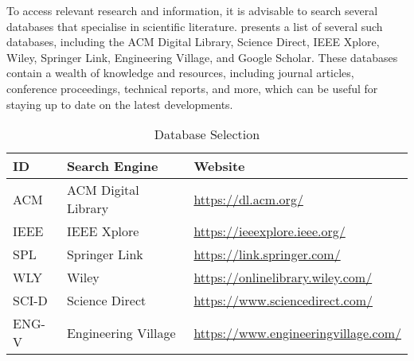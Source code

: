 To access relevant research and information, it is advisable to search several
databases that specialise in scientific literature. 
presents a list of several such databases, including the ACM Digital Library,
Science Direct, IEEE Xplore, Wiley, Springer Link, Engineering Village, and
Google Scholar. These databases contain a wealth of knowledge and resources,
including journal articles, conference proceedings, technical reports, and
more, which can be useful for staying up to date on the latest developments.

\begin{table}[!htb] \caption{Database Selection} \label{tab:databases}
  \begin{center}
    \begin{tabular}[c]{l|l|l} \textbf{ID} & \textbf{Search Engine} &
      \textbf{Website} \\
      \hline ACM & ACM Digital Library & \url{https://dl.acm.org/} \\
      \hline IEEE & IEEE Xplore & \url{https://ieeexplore.ieee.org/} \\
      \hline SPL & Springer Link & \url{https://link.springer.com/} \\
      \hline WLY & Wiley & \url{https://onlinelibrary.wiley.com/} \\
      \hline SCI-D & Science Direct & \url{https://www.sciencedirect.com/} \\
      \hline ENG-V & Engineering Village &
      \url{https://www.engineeringvillage.com/} \\
    \end{tabular}
  \end{center}
\end{table}
